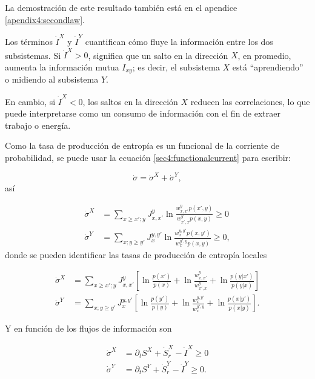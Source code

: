  La demostración de este resultado también está en el apendice \ref{apendix4:secondlaw}.

Los términos \( \dot{I}^{X} \) y \( \dot{I}^{Y} \) cuantifican cómo fluye la información entre los dos subsistemas. Si \( \dot{I}^{X} > 0 \), significa que un salto en la dirección \( X \), en promedio, aumenta la información mutua \( I_{xy} \); es decir, el subsistema \( X \) está ``aprendiendo'' o midiendo al subsistema \( Y \).

En cambio, si \( \dot{I}^{X} < 0 \), los saltos en la dirección \( X \) reducen las correlaciones, lo que puede interpretarse como un consumo de información con el fin de extraer trabajo o energía.

Como la tasa de producción de entropía es un funcional de la corriente de probabilidad, se puede usar la ecuación \ref{sec4:functionalcurrent} para escribir:


 \begin{equation*}
    \dot{\sigma} = \dot{\sigma}^{X} + \dot{\sigma}^{Y},
 \end{equation*}
así

\begin{align*}
    \dot{\sigma}^{X} & = \sum_{x \geq x';y} J_{x,x'}^{y} \ln  \frac{w_{x,x'}^{y} p(x',y) }{w_{x',x}^{y} p(x,y) } \geq 0 \\
    \dot{\sigma}^{Y} & = \sum_{x;y\geq y'}J_{x}^{y,y'} \ln \frac{w_{x}^{y,y'} p(x,y') }{ w_{x}^{y',y} p(x,y) } \geq 0, 
\end{align*}
donde se pueden identificar las tasas de producción de entropía locales

\begin{align*}
    \dot{\sigma}^{X} &  = \sum_{x \geq x';y} J_{x,x'}^{y} \left[ \ln \frac{p(x')}{p(x)}  +\ln \frac{w_{x,x'}^{y}}{ w_{x',x}^{y} } + \ln \frac{p(y|x')}{p(y|x)} \right] \\
    \dot{\sigma}^{Y} &  = \sum_{x;y \geq y'} J_{x}^{y,y'} \left[ \ln \frac{p(y')}{p(y)}  + \ln \frac{w_{x}^{y,y'}}{ w_{x}^{y',y} } + \ln \frac{p(x|y')}{p(x|y)} \right].
\end{align*}

Y en función de los flujos de información son  

\begin{align*}
    \dot{\sigma}^{X} & = \partial_{t}S^{X} + \dot{S}_{r}^{X} - \dot{I}^{X} \geq 0 \\
    \dot{\sigma}^{Y} & = \partial_{t}S^{Y} + \dot{S}_{r}^{Y} - \dot{I}^{Y} \geq 0.
\end{align*}

